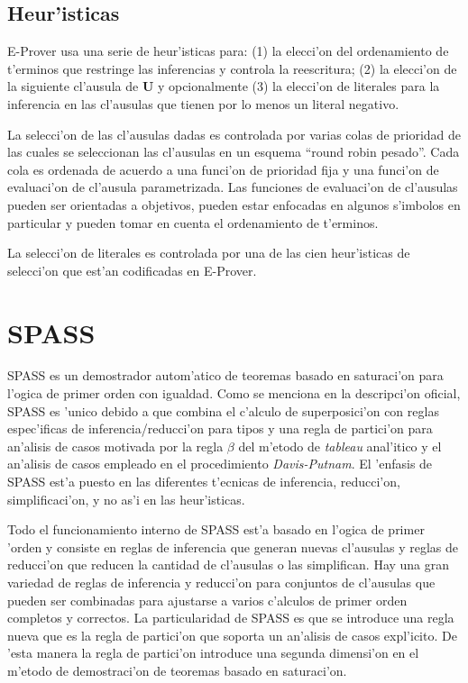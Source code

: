 \subsection{Heur'isticas}

E-Prover usa una serie de heur'isticas para: (1) la elecci'on del ordenamiento de t'erminos que restringe las inferencias y controla la reescritura; (2) la elecci'on de la siguiente cl'ausula de \textbf{U} y opcionalmente (3) la elecci'on de literales para la inferencia en las cl'ausulas que tienen por lo menos un literal negativo.

La selecci'on de las cl'ausulas dadas es controlada por varias colas de prioridad de las cuales se seleccionan las cl'ausulas en un esquema ``round robin pesado''. Cada cola es ordenada de acuerdo a una funci'on de prioridad fija y una funci'on de evaluaci'on de cl'ausula parametrizada. Las funciones de evaluaci'on de cl'ausulas pueden ser orientadas a objetivos, pueden estar enfocadas en algunos s'imbolos en particular y pueden tomar en cuenta el ordenamiento de t'erminos. 


La selecci'on de literales es controlada por una de las cien heur'isticas de selecci'on que est'an codificadas en E-Prover.



\section{SPASS}

SPASS es un demostrador autom'atico de teoremas basado en saturaci'on para l'ogica de primer orden con igualdad. Como se menciona en la descripci'on oficial, SPASS es 'unico debido a que combina el c'alculo de superposici'on con reglas espec'ificas de inferencia/reducci'on para tipos y una regla de partici'on para an'alisis de casos motivada por la regla $\beta$ del m'etodo de \textit{tableau} anal'itico y el an'alisis de casos empleado en el procedimiento \textit{Davis-Putnam}. El 'enfasis de SPASS est'a puesto en las diferentes t'ecnicas de inferencia, reducci'on, simplificaci'on, y no as'i en las heur'isticas.

Todo el funcionamiento interno de SPASS est'a basado en l'ogica de primer 'orden y consiste en reglas de inferencia que generan nuevas cl'ausulas y reglas de reducci'on que reducen la cantidad de cl'ausulas o las simplifican. Hay una gran variedad de reglas de inferencia y reducci'on para conjuntos de cl'ausulas que pueden ser combinadas para ajustarse a varios c'alculos de primer orden completos y correctos. La particularidad de SPASS es que se introduce una regla nueva que es la regla de partici'on que soporta un an'alisis de casos expl'icito. De 'esta manera la regla de partici'on introduce una segunda dimensi'on en el m'etodo de demostraci'on de teoremas basado en saturaci'on.

